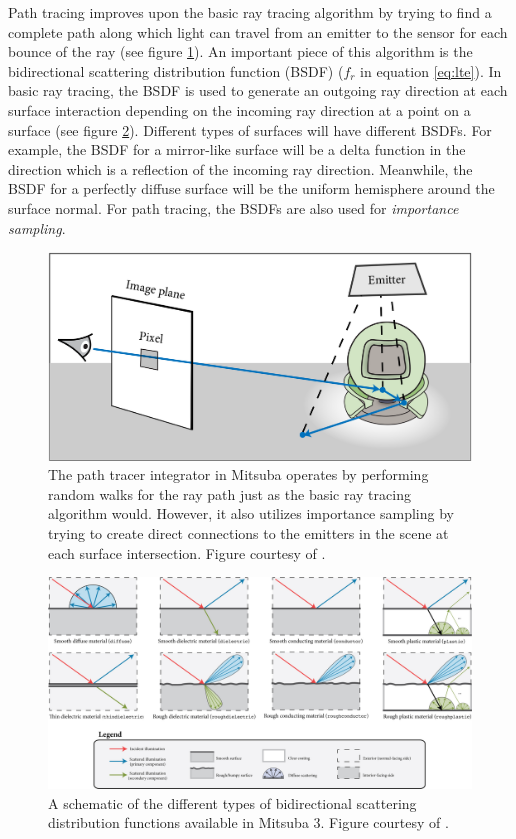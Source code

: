 \documentclass[11pt, letterpaper]{extarticle} %
\begin{document}
Path tracing improves upon the basic ray tracing algorithm by trying to find a complete path along which light can travel from an emitter to the sensor for each bounce of the ray \cite{jakob2022mitsuba3} (see figure \ref{fig:path_tracer}). An important piece of this algorithm is the bidirectional scattering distribution function (BSDF) ($f_r$ in equation \ref{eq:lte}). In basic ray tracing, the BSDF is used to generate an outgoing ray direction at each surface interaction depending on the incoming ray direction at a point on a surface (see figure \ref{fig:bsdf_overview}). Different types of surfaces will have different BSDFs. For example, the BSDF for a mirror-like surface will be a delta function in the direction which is a reflection of the incoming ray direction. Meanwhile, the BSDF for a perfectly diffuse surface will be the uniform hemisphere around the surface normal. For path tracing, the BSDFs are also used for \textit{importance sampling}.

\begin{figure}[h]
    \centering
    \includegraphics[width=0.75\linewidth]{figures/integrator_path_figure.png}
    \caption{The path tracer integrator in Mitsuba operates by performing random walks for the ray path just as the basic ray tracing algorithm would. However, it also utilizes importance sampling by trying to create direct connections to the emitters in the scene at each surface intersection. Figure courtesy of \cite{jakob2022mitsuba3}.}
    \label{fig:path_tracer}
\end{figure}

\begin{figure}[h]
    \centering
    \includegraphics[width=\linewidth]{figures/bsdf_overview.jpg}
    \caption{A schematic of the different types of bidirectional scattering distribution functions available in Mitsuba 3. Figure courtesy of \cite{jakob2022mitsuba3}.}
    \label{fig:bsdf_overview}
\end{figure}
\end{document}
